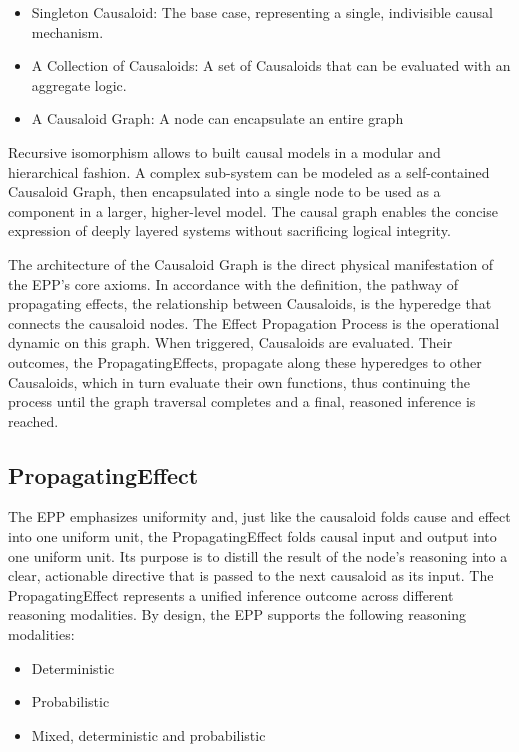 \begin{itemize}
 	\item Singleton Causaloid: The base case, representing a single, indivisible causal mechanism.
 	\item A Collection of Causaloids: A set of Causaloids that can be evaluated with an aggregate logic. 
 	\item A Causaloid Graph: A node can encapsulate an entire graph
\end{itemize}

Recursive isomorphism allows to built causal models in a modular and hierarchical fashion. 
A complex sub-system can be modeled as a self-contained Causaloid Graph, then encapsulated into a single node to be used as a component in a larger, higher-level model. The causal graph enables the concise expression of deeply layered systems without sacrificing logical integrity.

The architecture of the Causaloid Graph is the direct physical manifestation of the EPP's core axioms. In accordance with the definition, the pathway of propagating effects, the relationship between Causaloids, is the hyperedge that connects the causaloid nodes. The Effect Propagation Process is the operational dynamic on this graph. When triggered, Causaloids are evaluated. Their outcomes, the PropagatingEffects, propagate along these hyperedges to other Causaloids, which in turn evaluate their own functions, thus continuing the process until the graph traversal completes and a final, reasoned inference is reached.

%
%
\subsection{PropagatingEffect}
\label{sec:propagating_effect}

The EPP emphasizes uniformity and, just like the causaloid folds cause and effect into one uniform unit, the PropagatingEffect folds causal input and output into one uniform unit. Its purpose is to distill the result of the node's reasoning into a clear, actionable directive that is passed to the next causaloid as its input. The PropagatingEffect represents a unified inference outcome across different reasoning modalities. By design, the EPP supports the following reasoning modalities:

\begin{itemize}	
	\item Deterministic
	\item Probabilistic 
	\item Mixed, deterministic and probabilistic 
\end{itemize}

